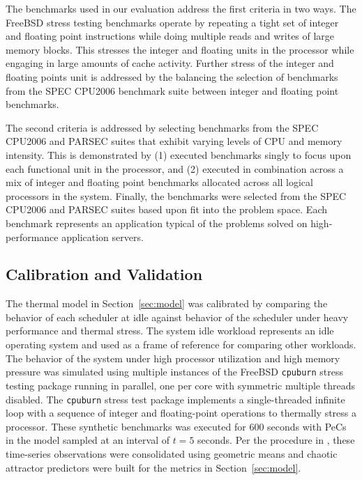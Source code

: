 \documentclass[times, 10pt,twocolumn]{IEEEtran}
\begin{document}
The benchmarks used in our evaluation address the first criteria in two
ways. The FreeBSD stress testing benchmarks operate by repeating a tight
set of integer and floating point instructions while doing multiple
reads and writes of large memory blocks.  This stresses the integer and
floating units in the processor while engaging in large amounts of cache
activity.  Further stress of the integer and floating points unit is
addressed by the balancing the selection of benchmarks from the SPEC
CPU2006 benchmark suite between integer and floating point benchmarks.

The second criteria is addressed by selecting benchmarks from the SPEC
CPU2006 and PARSEC suites that exhibit varying levels of CPU and memory
intensity.  This is demonstrated by (1) executed benchmarks singly to
focus upon each functional unit in the processor, and (2) executed in
combination across a mix of integer and floating point benchmarks
allocated across all logical processors in the system.  Finally, the
benchmarks were selected from the SPEC CPU2006 and PARSEC suites based
upon fit into the problem space.  Each benchmark represents an
application typical of the problems solved on high-performance
application servers.

\subsection{Calibration and Validation}
\label{sec:callibration} The thermal model in Section~\ref{sec:model}
was calibrated by comparing the behavior of each scheduler at idle
against behavior of the scheduler under heavy performance and thermal
stress. The system idle workload represents an idle operating system and
used as a frame of reference for comparing other workloads.  The
behavior of the system under high processor utilization and high memory
pressure was simulated using multiple instances of the FreeBSD
\texttt{cpuburn} stress testing package running in parallel, one per
core with symmetric multiple threads disabled.  The \texttt{cpuburn}
stress test package implements a single-threaded infinite loop with a
sequence of integer and floating-point operations to thermally stress a
processor.  These synthetic benchmarks was executed for 600 seconds with
PeCs in the model sampled at an interval of $t=5$ seconds.  Per the
procedure in \cite{Lewis2010}, these time-series observations were
consolidated using geometric means and chaotic attractor predictors were
built for the metrics in Section~\ref{sec:model}.
\end{document}
